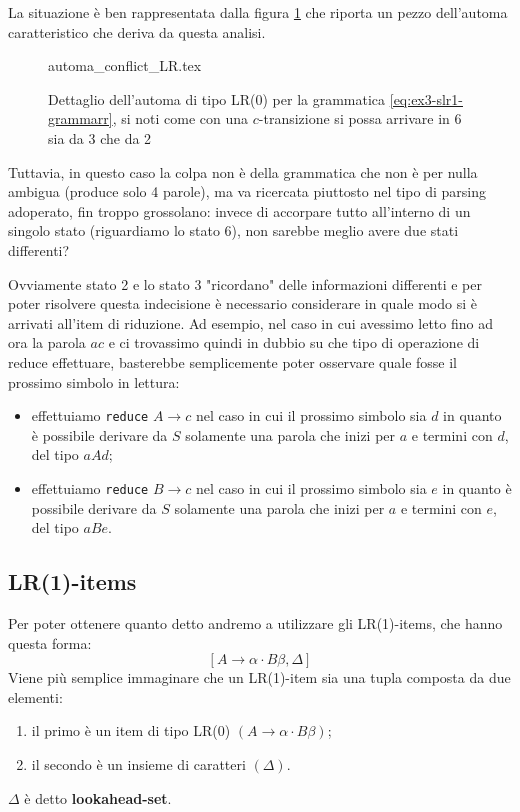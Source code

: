 \documentclass[class=book, crop=false, oneside, 12pt]{standalone}
\begin{document}
La situazione è ben rappresentata dalla figura \ref{fig:lr0-automata_conflict} che riporta un pezzo dell'automa caratteristico che deriva da questa analisi.

\begin{figure}[H]
    \centering
    {automa_conflict_LR.tex}
    \caption{Dettaglio dell'automa di tipo LR(0) per la grammatica \ref{eq:ex3-slr1-grammarr}, si noti come con una \(c\)-transizione si possa arrivare in 6 sia da 3 che da 2}
    \label{fig:lr0-automata_conflict}
\end{figure}

Tuttavia, in questo caso la colpa non è della grammatica che non è per nulla ambigua (produce solo 4 parole), ma va ricercata piuttosto nel tipo di parsing adoperato, fin troppo grossolano: invece di accorpare tutto all'interno di un singolo stato (riguardiamo lo stato 6), non sarebbe meglio avere due stati differenti? 

Ovviamente stato 2 e lo stato 3 "ricordano" delle informazioni differenti e per poter risolvere questa indecisione è necessario considerare in quale modo si è arrivati all'item di riduzione. Ad esempio, nel caso in cui avessimo letto fino ad ora la parola \(ac\) e ci trovassimo quindi in dubbio su che tipo di operazione di reduce effettuare, basterebbe semplicemente poter osservare quale fosse il prossimo simbolo in lettura: 
\begin{itemize}
    \item effettuiamo \texttt{reduce} \(A \to c\) nel caso in cui il prossimo simbolo sia \(d\) in quanto è possibile derivare da \(S\) solamente una parola che inizi per \(a\) e termini con \(d\), del tipo \(aAd\);
    \item effettuiamo \texttt{reduce} \(B \to c\) nel caso in cui il prossimo simbolo sia \(e\) in quanto è possibile derivare da \(S\) solamente una parola che inizi per \(a\) e termini con \(e\), del tipo \(aBe\).
\end{itemize}

\subsection{LR(1)-items}
Per poter ottenere quanto detto andremo a utilizzare gli LR(1)-items, che hanno questa forma:
\begin{equation}
    \label{lr0}
    [A \to \alpha \cdot B \beta, \Delta]
\end{equation}
Viene più semplice immaginare che un LR(1)-item sia una tupla composta da due elementi:
\begin{enumerate}
    \item il primo è un item di tipo LR(0) \((A \to \alpha \cdot B \beta)\);
    \item il secondo è un insieme di caratteri \((\Delta)\).
\end{enumerate} 
\(\Delta\) è detto \textbf{lookahead-set}.
\end{document}
